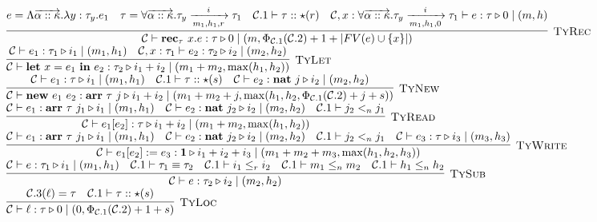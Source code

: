 \documentclass[fleqn]{article}
\begin{document}
\[\begin{array}{l}
	\infer[\textsc{TyRec}]{\jtygc{\mathcal{C} }{ \mathbf{rec}_\tau~x. e }{ \tau }{ 0 }{ m}{\Phi_{\mathcal{C}.1}(\mathcal{C}.2)+1+|FV(e)\cup\{x\}|}}{e = \Lambda \overrightarrow{\alpha :: \kappa}. \lambda y : \tau_y. e_1 & \tau = \forall \overrightarrow{\alpha :: \kappa}. \tau_y \xrightarrow[m_1,h_1,r]{i} \tau_1 & \mathcal{C}.1 \vdash \tau :: \star(r) & \jtygc{\mathcal{C},x:\forall \overrightarrow{\alpha::\kappa}. \tau_y \xrightarrow[m_1,h_1,0]{i} \tau_1 }{ e }{ \tau }{ 0 }{ m}{h}} \\
	\infer[\textsc{TyLet}]{\jtygc{\mathcal{C} }{ \mathbf{let}~x=e_1~\mathbf{in}~e_2 }{ \tau_2 }{ i_1 + i_2 }{ m_1 + m_2}{\max(h_1,h_2)}}{\jtygc{\mathcal{C} }{ e_1 }{ \tau_1 }{ i_1 }{ m_1 }{h_1} & \jtygc{\mathcal{C},x:\tau_1 }{ e_2 }{ \tau_2 }{ i_2 }{ m_2}{h_2}} \\
	\infer[\textsc{TyNew}]{\jtygc{\mathcal{C} }{ \mathbf{new}~e_1~e_2 }{ \mathbf{arr}~\tau~j }{ i_1 + i_2 }{ m_1 + m_2 + j}{\max(h_1,h_2,\Phi_{\mathcal{C}.1}(\mathcal{C}.2)+j+s)}}{\jtygc{\mathcal{C} }{ e_1 }{\tau }{ i_1 }{ m_1}{h_1} & \mathcal{C}.1 \vdash \tau :: \star(s) & \jtygc{\mathcal{C} }{ e_2 }{ \mathbf{nat}~j }{ i_2 }{ m_2}{h_2}} \\
	\infer[\textsc{TyRead}]{\jtygc{\mathcal{C} }{ e_1[e_2] }{ \tau }{ i_1 + i_2 }{ m_1 + m_2}{\max(h_1,h_2)}}{\jtygc{\mathcal{C} }{ e_1 }{ \mathbf{arr}~\tau~j_1 }{ i_1 }{ m_1}{h_1} & \jtygc{\mathcal{C} }{ e_2 }{ \mathbf{nat}~j_2 }{ i_2 }{ m_2}{h_2} & \mathcal{C}.1 \vdash j_2 <_n j_1} \\
	\infer[\textsc{TyWrite}]{\jtygc{\mathcal{C} }{ e_1[e_2] := e_3 }{ \mathbf{1} }{ i_1 + i_2 + i_3 }{ m_1 + m_2 + m_3}{\max(h_1,h_2,h_3)}}{\jtygc{\mathcal{C} }{ e_1 }{ \mathbf{arr}~\tau~j_1 }{ i_1 }{ m_1}{h_1} & \jtygc{\mathcal{C} }{ e_2 }{\mathbf{nat}~j_2 }{ i_2 }{ m_2}{h_2} & \mathcal{C}.1 \vdash j_2 <_n j_1 & \jtygc{\mathcal{C} }{ e_3 }{ \tau }{ i_3 }{ m_3}{h_3}} \\
	\infer[\textsc{TySub}]{\jtygc{\mathcal{C} }{ e }{\tau_2 }{ i_2 }{ m_2}{h_2}}{\jtygc{\mathcal{C} }{ e }{ \tau_1 }{ i_1 }{ m_1 }{h_1} & \mathcal{C}.1 \vdash \tau_1 \equiv \tau_2 & \mathcal{C}.1 \vdash i_1 \le_r i_2 & \mathcal{C}.1 \vdash m_1 \le_n m_2 & \mathcal{C}.1 \vdash h_1 \le_n h_2} \\
	\infer[\textsc{TyLoc}]{\jtygc{\mathcal{C}}{\ell}{\tau}{0}{0}{\Phi_{\mathcal{C}.1}(\mathcal{C}.2) + 1 + s}}{ \mathcal{C}.3(\ell) = \tau & \mathcal{C}.1 \vdash \tau :: \star(s) }
\end{array}
\]
\end{document}
